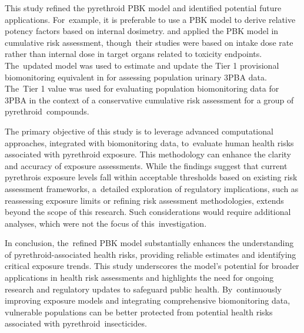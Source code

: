 \documentclass[toxics,article,accept,pdftex,moreauthors]{Definitions/mdpi}
\begin{document}
This study refined the pyrethroid PBK model and identified potential
future applications. For~example, it is preferable to use a PBK model to
derive relative potency factors based on internal dosimetry.
\citet{quindroit2021estimating} and \citet{thepaut_pbpk_2024} applied
the PBK model in cumulative risk assessment, though~their studies were
based on intake dose rate rather than internal dose in target organs
related to toxicity endpoints. The~updated model was used to estimate
and update the Tier 1 provisional biomonitoring equivalent in
\citet{aylward_screening_level_2018} for assessing population urinary
3PBA data. The~Tier 1 value was used for evaluating population
biomonitoring data for 3PBA in the context of a conservative cumulative
risk assessment for a group of pyrethroid~compounds.

The primary objective of this study is to leverage advanced computational
approaches, integrated with biomonitoring data, to~evaluate human health risks
associated with pyrethroid exposure. This methodology can enhance the clarity
and accuracy of exposure assessments. While the findings suggest that current
pyrethrois exposure levels fall within acceptable thresholds based on existing risk
assessment frameworks, a~detailed exploration of regulatory implications, such
as reassessing exposure limits or refining risk assessment methodologies,
extends beyond the scope of this research. Such considerations would require
additional analyses, which were not the focus of this~investigation.

In conclusion, the~refined PBK model substantially enhances the
understanding of pyrethroid-associated health risks, providing reliable
estimates and identifying critical exposure trends. This study
underscores the model's potential for broader applications in health
risk assessments and highlights the need for ongoing research and
regulatory updates to safeguard public health. By~continuously improving
exposure models and integrating comprehensive biomonitoring data, vulnerable populations can be better protected from potential health risks
associated with pyrethroid~insecticides.


\vspace{6pt} 

\end{document}
